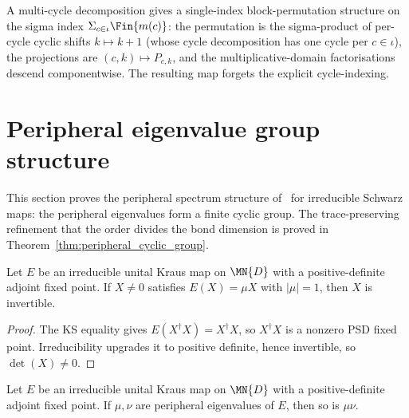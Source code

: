 \begin{definition}
    \label{def:multi_cycle_to_cycle_structure}
    \leanok
    A multi-cycle decomposition gives a single-index block-permutation
    structure on the sigma index $\Sigma_{c \in \iota} \Fin{m(c)}$: the
    permutation is the sigma-product of per-cycle cyclic shifts
    $k \mapsto k+1$ (whose cycle decomposition has one cycle per
    $c \in \iota$), the projections are $(c, k) \mapsto P_{c,k}$, and the
    multiplicative-domain factorisations descend componentwise. The
    resulting map forgets the explicit cycle-indexing.
\end{definition}

\section{Peripheral eigenvalue group structure}

This section proves the peripheral spectrum structure of~\cite[Theorem~6.6]{Wolf2012Quantum} for irreducible Schwarz maps:
the peripheral eigenvalues form a finite cyclic group.
The trace-preserving refinement that the order divides the bond
dimension is proved in
Theorem~\ref{thm:peripheral_cyclic_group}.

\begin{lemma}%
    \label{lem:isUnit_peripheral_eigenvector}
    \leanok
    Let $E$ be an irreducible unital Kraus map on $\MN{D}$ with a
    positive-definite adjoint fixed point.
    If $X \ne 0$ satisfies $E(X) = \mu X$ with $|\mu| = 1$,
    then $X$ is invertible.
\end{lemma}

\begin{proof}
    \leanok
    The KS equality gives $E(X^\dagger X) = X^\dagger X$, so $X^\dagger X$
    is a nonzero PSD fixed point. Irreducibility upgrades it to positive
    definite, hence invertible, so $\det(X) \ne 0$.
\end{proof}

\begin{lemma}%
    \label{lem:peripheral_mul_closure}
    \leanok
    Let $E$ be an irreducible unital Kraus map on $\MN{D}$ with a
    positive-definite adjoint fixed point.
    If $\mu, \nu$ are peripheral eigenvalues of $E$, then so is $\mu\nu$.
\end{lemma}

